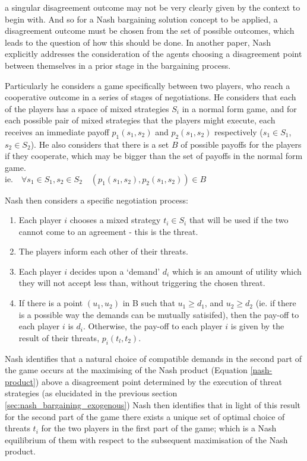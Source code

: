 \documentclass[
10pt, %
a4paper, %
oneside, %
headinclude,footinclude, %
BCOR5mm, %
]{scrartcl}
\begin{document}
a singular disagreement outcome may not be very clearly given by the context to begin with.
And so for a Nash bargaining solution concept to be applied, a disagreement outcome must be chosen from the set of possible outcomes, which leads to the question of how this should be done.
In another paper, Nash explicitly addresses the consideration of the agents choosing a disagreement point between themselves in a prior stage in the bargaining process.

Particularly he considers a game specifically between two players, who reach a cooperative outcome in a series of stages of negotiations.
He considers that each of the players has a space of mixed strategies $S_i$ in a normal form game, and for each possible pair of mixed strategies that the players might execute, each receives an immediate payoff $p_1(s_1,s_2)$ and $p_2(s_1,s_2)$ respectively ($s_1\in S_1$, $s_2\in S_2$).
He also considers that there is a set $B$ of possible payoffs for the players if they cooperate, which may be bigger than the set of payoffs in the normal form game.\\
$\text{ie.}\quad \forall s_1\in S_1,s_2\in S_2 \quad (p_1(s_1,s_2), p_2(s_1,s_2)) \in B$

Nash then considers a specific negotiation process:
\begin{enumerate}
\item Each player $i$ chooses a mixed strategy $t_i\in S_i$ that will be used if the two cannot come to an agreement - this is the threat.
\item The players inform each other of their threats.
\item Each player $i$ decides upon a `demand' $d_i$ which is an amount of utility which they will not accept less than, without triggering the chosen threat.
\item If there is a point $(u_1,u_2)$ in B such that $u_1 \ge d_1$, and $u_2 \ge d_2$ (ie. if there is a possible way the demands can be mutually satisifed), then the pay-off to each player $i$ is $d_i$. Otherwise, the pay-off to each player $i$ is given by the result of their threats, $p_i(t_l, t_2)$.
\end{enumerate}

Nash identifies that a natural choice of compatible demands in the second part of the game occurs at the maximising of the Nash product (Equation \ref{nash-product}) above a disagreement point determined by the execution of threat strategies (as elucidated in the previous section \ref{sec:nash_bargaining_exogenous})
Nash then identifies that in light of this result for the second part of the game there exists a unique set of optimal choice of threats $t_i$ for the two players in the first part of the game; which is a Nash equilibrium of them with respect to the subsequent maximisation of the Nash product.
\end{document}
